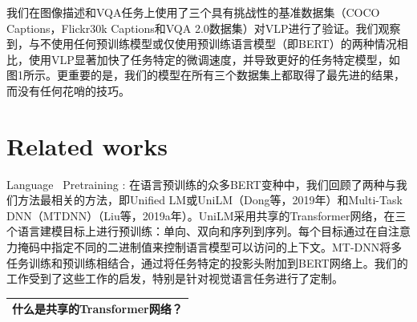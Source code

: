 \documentclass[a4paper]{article}
\begin{document}
\begin{sloppypar}
\begin{table}[!htbp]
      \end{table}%

      我们在图像描述和VQA任务上使用了三个具有挑战性的基准数据集（COCO Captions，Flickr30k Captions和VQA 2.0数据集）对VLP进行了验证。我们观察到，与不使用任何预训练模型或仅使用预训练语言模型（即BERT）的两种情况相比，使用VLP显著加快了任务特定的微调速度，并导致更好的任务特定模型，如图1所示。更重要的是，我们的模型在所有三个数据集上都取得了最先进的结果，而没有任何花哨的技巧。


      \section{Related works}

      Language  Pretraining : 在语言预训练的众多BERT变种中，我们回顾了两种与我们方法最相关的方法，即Unified LM或UniLM（Dong等，2019年）和Multi-Task DNN（MTDNN）（Liu等，2019a年）。UniLM采用共享的Transformer网络，在三个语言建模目标上进行预训练：单向、双向和序列到序列。每个目标通过在自注意力掩码中指定不同的二进制值来控制语言模型可以访问的上下文。MT-DNN将多任务训练和预训练相结合，通过将任务特定的投影头附加到BERT网络上。我们的工作受到了这些工作的启发，特别是针对视觉语言任务进行了定制。
      \begin{table}[!htbp]
            \renewcommand\arraystretch{2}

            \centering
            \begin{tabularx}{\textwidth}{|X|}
                  \hline
                  什么是共享的Transformer网络？
                  \\
                  \hline
            \end{tabularx}%

      \end{table}%



\end{sloppypar}
\end{document}
